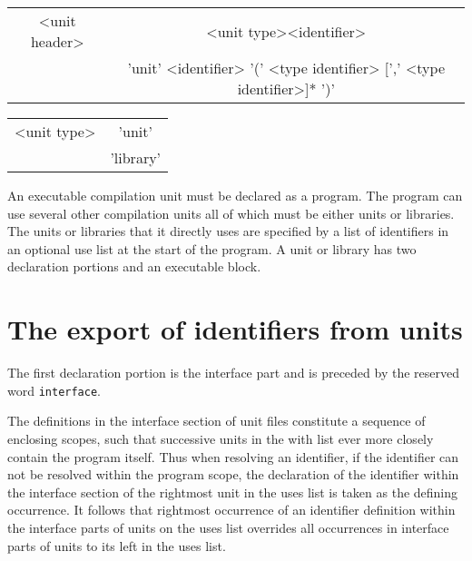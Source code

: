 {{\begin{tabular}{|c|c|}
\hline
\end{tabular}\par}

\vspace{0.2cm}
{\centering \begin{tabular}{|c|c|}
\hline
<unit header>&
<unit type><identifier>\\
&'unit' <identifier> '(' <type identifier> [',' <type identifier>]* ')'\\

\hline
\end{tabular}\par}
\vspace{0.2cm}

\vspace{0.2cm}
{\centering \begin{tabular}{|c|c|}
\hline
<unit type>&
'unit'\\
&
'library'\\
\hline
\end{tabular}\par}
\vspace{0.2cm}

An executable compilation unit must be declared as a program.
The program can use several other compilation units all of which must be either
units or libraries. The units or libraries that it directly uses are specified
by a list of identifiers in an optional use list at the start of the program.
A unit or library has two declaration portions and an executable block.


\section{The export of identifiers from units}

The first declaration portion is the interface part and is preceded by the reserved
word \texttt{interface}.

The definitions in the interface section of unit files constitute a sequence
of enclosing scopes, such that successive units in the with list ever more closely
contain the program itself. Thus when resolving an identifier, if the identifier
can not be resolved within the program scope, the declaration of the identifier
within the interface section of the rightmost unit in the uses list is taken
as the defining occurrence. It follows that rightmost occurrence of an identifier
definition within the interface parts of units on the uses list overrides all
occurrences in interface parts of units to its left in the uses list.

}
